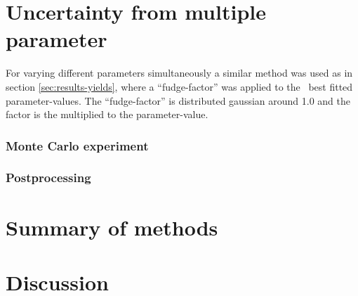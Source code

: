 \section{Uncertainty from multiple parameter}
For varying different parameters simultaneously a similar method was used as in section \ref{sec:results-yields}, where a ``fudge-factor'' was applied to the \eris\ best fitted parameter-values. The ``fudge-factor'' is distributed gaussian around 1.0 and the factor is the multiplied to the parameter-value.


\subsubsection{Monte Carlo experiment}

\subsubsection{Postprocessing}

\FloatBarrier

\section{Summary of methods}
\section{Discussion}

\iffalse

